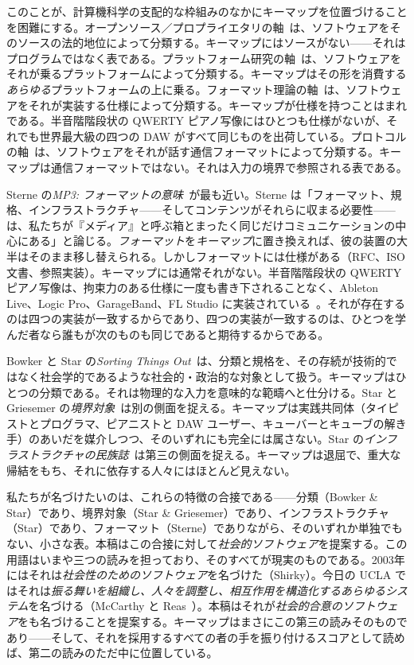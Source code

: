 \documentclass[10pt,letterpaper,twocolumn]{article}
\begin{document}
このことが、計算機科学の支配的な枠組みのなかにキーマップを位置づけることを困難にする。オープンソース／プロプライエタリの軸~\citep{galloway2004protocol}は、ソフトウェアをそのソースの法的地位によって分類する。キーマップにはソースがない——それはプログラムではなく表である。プラットフォーム研究の軸~\citep{nieborg2018platformization}は、ソフトウェアをそれが乗るプラットフォームによって分類する。キーマップはその形を消費する\emph{あらゆる}プラットフォームの上に乗る。フォーマット理論の軸~\citep{sterne2012mp3}は、ソフトウェアをそれが実装する仕様によって分類する。キーマップが仕様を持つことはまれである。半音階階段状の QWERTY ピアノ写像にはひとつも仕様がないが、それでも世界最大級の四つの DAW がすべて同じものを出荷している。プロトコルの軸~\citep{galloway2004protocol}は、ソフトウェアをそれが話す通信フォーマットによって分類する。キーマップは通信フォーマットではない。それは入力の境界で参照される表である。

Sterne の\emph{MP3: フォーマットの意味}~\citep{sterne2012mp3}が最も近い。Sterne は「フォーマット、規格、インフラストラクチャ——そしてコンテンツがそれらに収まる必要性——は、私たちが『メディア』と呼ぶ箱とまったく同じだけコミュニケーションの中心にある」と論じる。\emph{フォーマット}を\emph{キーマップ}に置き換えれば、彼の装置の大半はそのまま移し替えられる。しかしフォーマットには仕様がある（RFC、ISO 文書、参照実装）。キーマップには通常それがない。半音階階段状の QWERTY ピアノ写像は、拘束力のある仕様に一度も書き下されることなく、Ableton Live、Logic Pro、GarageBand、FL Studio に実装されている~\citep{ableton_musical_typing,apple_logic_musicaltyping,imageline_typing_piano}。それが存在するのは四つの実装が一致するからであり、四つの実装が一致するのは、ひとつを学んだ者なら誰もが次のものも同じであると期待するからである。

Bowker と Star の\emph{Sorting Things Out}~\citep{bowker1999sorting}は、分類と規格を、その存続が技術的ではなく社会学的であるような社会的・政治的な対象として扱う。キーマップはひとつの分類である。それは物理的な入力を意味的な範疇へと仕分ける。Star と Griesemer の\emph{境界対象}~\citep{star1989boundary}は別の側面を捉える。キーマップは実践共同体（タイピストとプログラマ、ピアニストと DAW ユーザー、キューバーとキューブの解き手）のあいだを媒介しつつ、そのいずれにも完全には属さない。Star の\emph{インフラストラクチャの民族誌}~\citep{star1999ethnography}は第三の側面を捉える。キーマップは退屈で、重大な帰結をもち、それに依存する人々にはほとんど見えない。

私たちが名づけたいのは、これらの特徴の合接である——分類（Bowker \& Star）であり、境界対象（Star \& Griesemer）であり、インフラストラクチャ（Star）であり、フォーマット（Sterne）でありながら、そのいずれか単独でもない、小さな表。本稿はこの合接に対して\emph{社会的ソフトウェア}を提案する。この用語はいまや三つの読みを担っており、そのすべてが現実のものである。2003年にはそれは\emph{社会性のためのソフトウェア}を名づけた（Shirky）。今日の UCLA ではそれは\emph{振る舞いを組織し、人々を調整し、相互作用を構造化するあらゆるシステム}を名づける（McCarthy と Reas~\citep{sosoft_info}）。本稿はそれが\emph{社会的合意のソフトウェア}をも名づけることを提案する。キーマップはまさにこの第三の読みそのものであり——そして、それを採用するすべての者の手を振り付けるスコアとして読めば、第二の読みのただ中に位置している。
\end{document}

